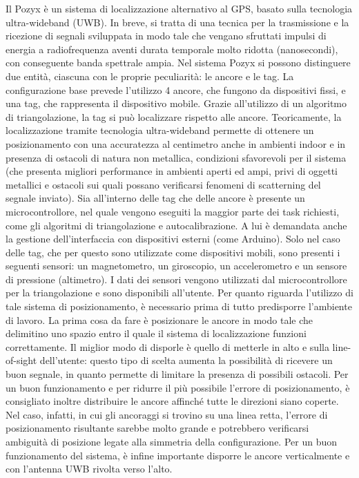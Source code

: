Il Pozyx è un sistema di localizzazione alternativo al GPS, basato sulla tecnologia ultra-wideband
(UWB). In breve, si tratta di una tecnica per la trasmissione e la ricezione di segnali sviluppata in modo tale che vengano sfruttati impulsi di energia a radiofrequenza aventi durata temporale molto ridotta (nanosecondi), con conseguente banda spettrale ampia.
Nel sistema Pozyx si possono distinguere due entità, ciascuna con le proprie peculiarità: le ancore e le tag.
La configurazione base prevede l'utilizzo 4 ancore, che fungono da dispositivi fissi, e una tag, che rappresenta il dispositivo mobile.
Grazie all'utilizzo di un algoritmo di triangolazione, la tag si può localizzare rispetto alle ancore. Teoricamente, la localizzazione tramite tecnologia ultra-wideband permette di ottenere un posizionamento con una accuratezza al centimetro anche
in ambienti indoor e in presenza di ostacoli di natura non metallica, condizioni sfavorevoli per il sistema (che presenta 
migliori performance in ambienti aperti ed ampi, privi di oggetti metallici e ostacoli sui quali possano verificarsi fenomeni di scatterning 
del segnale inviato). 
Sia all'interno delle tag che delle ancore è presente un microcontrollore, nel quale vengono eseguiti la maggior parte dei task richiesti,
come gli algoritmi di triangolazione e autocalibrazione. A lui è demandata anche la gestione dell’interfaccia con dispositivi esterni
(come Arduino).
Solo nel caso delle tag, che per questo sono utilizzate come dispositivi mobili, sono presenti i seguenti sensori: un magnetometro, un giroscopio, un
accelerometro e un sensore di pressione (altimetro). I dati dei sensori vengono utilizzati dal microcontrollore
per la triangolazione e sono disponibili all’utente.
Per quanto riguarda l'utilizzo di tale sistema di posizionamento, è necessario prima di tutto predisporre l'ambiente di lavoro.
La prima cosa da fare è posizionare le ancore in modo tale che delimitino uno spazio entro il quale il sistema di localizzazione
funzioni correttamente. Il miglior modo di disporle è quello di metterle in alto e sulla line-of-sight dell’utente: questo tipo di scelta
aumenta la possibilità di ricevere un buon segnale, in quanto permette di limitare la presenza di possibili ostacoli. 
Per un buon funzionamento e per ridurre il più possibile l'errore di posizionamento, è consigliato inoltre distribuire le ancore affinché tutte le 
direzioni siano coperte.
Nel caso, infatti, in cui gli ancoraggi si trovino su una linea retta, l'errore di posizionamento risultante sarebbe molto grande e potrebbero
verificarsi ambiguità di posizione legate alla simmetria della configurazione.
Per un buon funzionamento del sistema, è infine importante disporre le ancore verticalmente e con l’antenna UWB rivolta verso l’alto.

